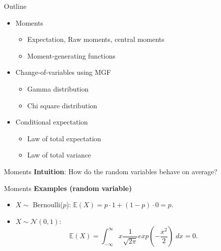 \documentclass [aspectratio=169]{beamer}
\begin{document}
\begin{frame}{Outline}
\begin{itemize}
    \item Moments
    \begin{itemize}
        \item Expectation, Raw moments, central moments
        \item Moment-generating functions
    \end{itemize}
    \item Change-of-variables using MGF
    \begin{itemize}
        \item Gamma distribution
        \item Chi square distribution
    \end{itemize}
    \item Conditional expectation
    \begin{itemize}
        \item Law of total expectation
        \item Law of total variance
    \end{itemize}
\end{itemize}
\end{frame}


\begin{frame}{Moments}
\textbf{Intuition}: How do the random variables behave on average?\\
\end{frame}

\begin{frame}{Moments}
    \textbf{Examples (random variable)}
    \begin{itemize}
        \item $X \sim $ Bernoulli($p$): $\mathbb{E}(X) = p\cdot 1 + (1-p)\cdot 0 = p$.
        \item $X \sim \mathcal{N}(0, 1)$: 
        $$
        \mathbb{E}(X) = \int_{-\infty}^{\infty}x 
        \frac{1}{\sqrt{2\pi}}exp(-\frac{x^2}{2})\; dx = 0.
        $$
    \end{itemize}
    \vspace{0.1in}
\end{frame}
\end{document}
